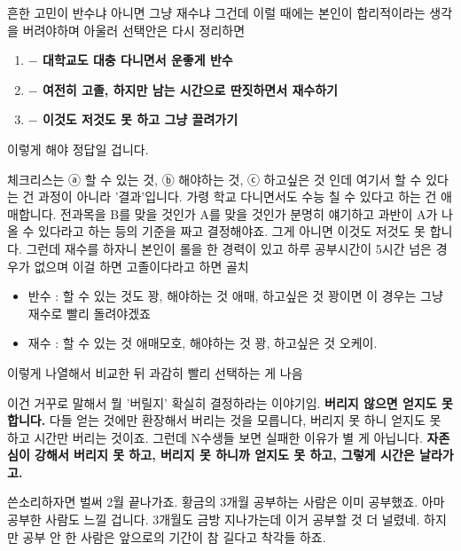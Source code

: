 \vspace{5mm}

흔한 고민이 반수냐 아니면 그냥 재수냐 그건데
이럴 때에는 본인이 합리적이라는 생각을 버려야하며
아울러 선택안은 다시 정리하면
\vspace{5mm}
\begin{enumerate}
    \item \textbf{$-$ 대학교도 대충 다니면서 운좋게 반수}
    \item \textbf{$-$ 여전히 고졸, 하지만 남는 시간으로 딴짓하면서 재수하기}
    \item \textbf{$-$ 이것도 저것도 못 하고 그냥 끌려가기}
\end{enumerate}
\vspace{5mm}

이렇게 해야 정답일 겁니다.
\vspace{5mm}

체크리스는 ⓐ 할 수 있는 것, ⓑ 해야하는 것, ⓒ 하고싶은 것 인데
여기서 할 수 있다는 건 과정이 아니라 '결과'입니다.
가령 학교 다니면서도 수능 칠 수 있다고 하는 건 애매합니다.
전과목을 B를 맞을 것인가 A를 맞을 것인가 분명히 얘기하고 과반이 A가 나올 수 있다라고 하는 등의 기준을 짜고 결정해야죠.
그게 아니면 이것도 저것도 못 합니다.
그런데 재수를 하자니 본인이 롤을 한 경력이 있고 하루 공부시간이 5시간 넘은 경우가 없으며 이걸 하면 고졸이다라고 하면 골치
\vspace{5mm}

\begin{itemize}
    \item 반수 : 할 수 있는 것도 꽝, 해야하는 것 애매, 하고싶은 것 꽝이면 이 경우는 그냥 재수로 빨리 돌려야겠죠
    \item 재수 : 할 수 있는 것 애매모호, 해야하는 것 꽝, 하고싶은 것 오케이.
\end{itemize}
\vspace{5mm}

이렇게 나열해서 비교한 뒤 과감히 빨리 선택하는 게 나음
\vspace{5mm}

이건 거꾸로 말해서 뭘 '버릴지' 확실히 결정하라는 이야기임. \textbf{버리지 않으면 얻지도 못 합니다.}
다들 얻는 것에만 환장해서 버리는 것을 모릅니다, 버리지 못 하니 얻지도 못 하고 시간만 버리는 것이죠.
그런데 N수생들 보면 실패한 이유가 별 게 아닙니다.
\textbf{자존심이 강해서 버리지 못 하고, 버리지 못 하니까 얻지도 못 하고, 그렇게 시간은 날라가고.}
\vspace{5mm}

쓴소리하자면 벌써 2월 끝나가죠. 황금의 3개월 공부하는 사람은 이미 공부했죠.
아마 공부한 사람도 느낄 겁니다. 3개월도 금방 지나가는데 이거 공부할 것 더 널렸네.
하지만 공부 안 한 사람은 앞으로의 기간이 참 길다고 착각들 하죠.
\vspace{5mm}

